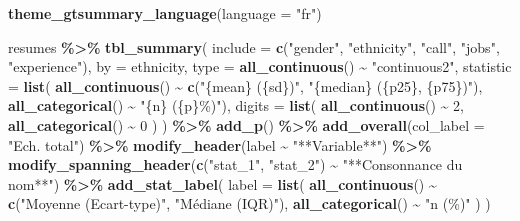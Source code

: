 \documentclass[
  11pt,
]{book}
\newenvironment{Shaded}{\begin{snugshade}}{\end{snugshade}}
\newcommand{\AttributeTok}[1]{\textcolor[rgb]{0.13,0.29,0.53}{#1}}
\newcommand{\DecValTok}[1]{\textcolor[rgb]{0.00,0.00,0.81}{#1}}
\newcommand{\FunctionTok}[1]{\textcolor[rgb]{0.13,0.29,0.53}{\textbf{#1}}}
\newcommand{\NormalTok}[1]{#1}
\newcommand{\SpecialCharTok}[1]{\textcolor[rgb]{0.81,0.36,0.00}{\textbf{#1}}}
\newcommand{\StringTok}[1]{\textcolor[rgb]{0.31,0.60,0.02}{#1}}
\numberwithin{equation}{section}
\numberwithin{countremarque}{section}
\begin{document}
\begin{Shaded}
\begin{Highlighting}[]
\FunctionTok{theme\_gtsummary\_language}\NormalTok{(}\AttributeTok{language =} \StringTok{"fr"}\NormalTok{)}
\end{Highlighting}
\end{Shaded}

\begin{Shaded}
\begin{Highlighting}[]
\NormalTok{resumes }\SpecialCharTok{\%\textgreater{}\%}
  \FunctionTok{tbl\_summary}\NormalTok{(}
    \AttributeTok{include =} \FunctionTok{c}\NormalTok{(}\StringTok{"gender"}\NormalTok{, }\StringTok{"ethnicity"}\NormalTok{, }\StringTok{"call"}\NormalTok{, }\StringTok{"jobs"}\NormalTok{, }\StringTok{"experience"}\NormalTok{),}
    \AttributeTok{by =}\NormalTok{ ethnicity,}
    \AttributeTok{type =} \FunctionTok{all\_continuous}\NormalTok{() }\SpecialCharTok{\textasciitilde{}} \StringTok{"continuous2"}\NormalTok{,}
    \AttributeTok{statistic =} \FunctionTok{list}\NormalTok{(}
      \FunctionTok{all\_continuous}\NormalTok{() }\SpecialCharTok{\textasciitilde{}} \FunctionTok{c}\NormalTok{(}\StringTok{"\{mean\} (\{sd\})"}\NormalTok{, }\StringTok{"\{median\} (\{p25\}, \{p75\})"}\NormalTok{),}
      \FunctionTok{all\_categorical}\NormalTok{() }\SpecialCharTok{\textasciitilde{}} \StringTok{"\{n\} (\{p\}\%)"}\NormalTok{),}
    \AttributeTok{digits =} \FunctionTok{list}\NormalTok{(}
      \FunctionTok{all\_continuous}\NormalTok{() }\SpecialCharTok{\textasciitilde{}} \DecValTok{2}\NormalTok{,}
      \FunctionTok{all\_categorical}\NormalTok{() }\SpecialCharTok{\textasciitilde{}} \DecValTok{0}
\NormalTok{    )}
\NormalTok{  ) }\SpecialCharTok{\%\textgreater{}\%} 
  \FunctionTok{add\_p}\NormalTok{() }\SpecialCharTok{\%\textgreater{}\%} 
  \FunctionTok{add\_overall}\NormalTok{(}\AttributeTok{col\_label =} \StringTok{"Ech. total"}\NormalTok{) }\SpecialCharTok{\%\textgreater{}\%} 
  \FunctionTok{modify\_header}\NormalTok{(label }\SpecialCharTok{\textasciitilde{}} \StringTok{"**Variable**"}\NormalTok{) }\SpecialCharTok{\%\textgreater{}\%} 
  \FunctionTok{modify\_spanning\_header}\NormalTok{(}\FunctionTok{c}\NormalTok{(}\StringTok{"stat\_1"}\NormalTok{, }\StringTok{"stat\_2"}\NormalTok{) }\SpecialCharTok{\textasciitilde{}} \StringTok{"**Consonnance du nom**"}\NormalTok{) }\SpecialCharTok{\%\textgreater{}\%} 
  \FunctionTok{add\_stat\_label}\NormalTok{(}
    \AttributeTok{label =} \FunctionTok{list}\NormalTok{(}
      \FunctionTok{all\_continuous}\NormalTok{() }\SpecialCharTok{\textasciitilde{}} \FunctionTok{c}\NormalTok{(}\StringTok{"Moyenne (Ecart{-}type)"}\NormalTok{, }\StringTok{"Médiane (IQR)"}\NormalTok{),}
      \FunctionTok{all\_categorical}\NormalTok{() }\SpecialCharTok{\textasciitilde{}} \StringTok{"n (\%)"}
\NormalTok{    )}
\NormalTok{  )}
\end{Highlighting}
\end{Shaded}
\end{document}
